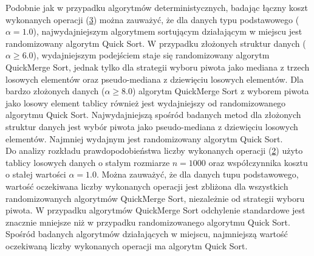 Podobnie jak w przypadku algorytmów deterministycznych, badając łączny koszt wykonanych operacji (\ref{fig:quick-merge-sort-nondeterministic-pivot-cost-factor}) można zauważyć, że dla danych typu podstawowego ($\alpha = 1.0$), najwydajniejszym algorytmem sortującym działającym w miejscu jest randomizowany algorytm Quick Sort.
W przypadku złożonych struktur danych ($\alpha \ge 6.0$), wydajniejszym podejściem staje się randomizowany algorytm QuickMerge Sort, jednak tylko dla strategii wyboru piwota jako mediana z trzech losowych elementów oraz pseudo-mediana z dziewięciu losowych elementów. Dla bardzo złożonych danych ($\alpha \ge 8.0$) algorytm QuickMerge Sort z wyborem piwota jako losowy element tablicy również jest wydajniejszy od randomizowanego algorytmu Quick Sort. Najwydajniejszą spośród badanych metod dla złożonych struktur danych jest wybór piwota jako pseudo-mediana z dziewięciu losowych elementów. Najmniej wydajnym jest randomizowany algorytm Quick Sort.\\


Do analizy rozkładu prawdopodobieństwa liczby wykonanych operacji (\ref{fig:quick-merge-sort-nondeterministic-pivot-density}) użyto tablicy losowych danych o stałym rozmiarze $n = 1000$ oraz współczynnika kosztu o stałej wartości $\alpha = 1.0$. Można zauważyć, że dla danych tupu podstawowego, wartość oczekiwana liczby wykonanych operacji jest zbliżona dla wszystkich randomizowanych algorytmów QuickMerge Sort, niezależnie od strategii wyboru piwota. W przypadku algorytmów QuickMerge Sort odchylenie standardowe jest znacznie mniejsze niż w przypadku randomizowanego algorytmu Quick Sort. Spośród badanych algorytmów działających w miejscu, najmniejszą wartość oczekiwaną liczby wykonanych operacji ma algorytm Quick Sort.\\

\begin{figure}[]
	\centering
	
	\caption[]{}
	\label{fig:quick-merge-sort-nondeterministic-pivot-random}
\end{figure}

\begin{figure}[]
	\centering
	
	\caption[]{}
	\label{fig:quick-merge-sort-nondeterministic-pivot-density}
\end{figure}

\begin{figure}[]
	\centering
	
	\caption[]{}
	\label{fig:quick-merge-sort-nondeterministic-pivot-cost-factor}
\end{figure}

